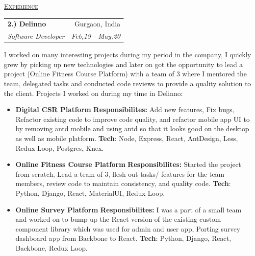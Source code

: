 \documentclass[11pt, a4paper]{article}
\begin{document}
\setlength\tabcolsep{0pt}
\begin{flushleft}
    \uline{\textsc{\large{Experience}}\hfill}
    \newline
    \newline
    \begin{tabularx}{\textwidth}{X r}
        \large{\textbf{2.) Delinno}} & Gurgaon, India\\
        \textit{Software Developer}  & \textit {Feb,19 - May,20}\\
    \end{tabularx}
\end{flushleft}

\begin{flushleft}
I worked on many interesting projects during my period in the company, I quickly grew by picking up new technologies and later on got the opportunity to lead a project (Online Fitness Course Platform) with a team of 3 where I mentored the team, delegated tasks and conducted code reviews to provide a quality solution to the client.
\newline
\newline
Projects I worked on during my time in Delinno:
\begin{itemize}
    \item {\bf{Digital CSR Platform}}
    \newline
    \textbf{Responsibilites:} Add new features, Fix bugs, Refactor existing code to improve code quality, and refactor mobile app UI to by removing antd mobile and using antd so that it looks good on the desktop as well as mobile platform.
    \newline
    \textbf{Tech}: Node, Express, React, AntDesign, Less, Redux Loop, Postgres, Knex. 

    \item \textbf{Online Fitness Course Platform}
    \newline
    \textbf{Responsibilites:} Started the project from scratch, Lead a team of 3, flesh out tasks/ features for the team members, review code to maintain consistency, and quality code.
    \newline
    \textbf{Tech}: Python, Django, React, MaterialUI, Redux Loop.

    \item \textbf{Online Survey Platform}
    \newline
    \textbf{Responsibilites:} I was a part of a small team and worked on to bump up the React version of the existing custom component library which was used for admin and user app, Porting survey dashboard app from Backbone to React.
    \newline
    \textbf{Tech}: Python, Django, React, Backbone, Redux Loop.


\end{itemize}
\end{flushleft}
\end{document}
